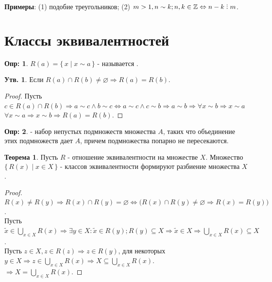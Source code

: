 \documentclass[12pt]{article}
\theoremstyle{definition}
\newtheorem{defn}{Опр:}
\newtheorem{prop}{Утв.}
\newtheorem{theorem}{Теорема}
\DeclareRobustCommand{\divby}{%
	\mathrel{\text{\vbox{\baselineskip.65ex\lineskiplimit0pt\hbox{.}\hbox{.}\hbox{.}}}}%
}
\begin{document}
\textbf{Примеры}: (1) подобие треугольников; (2) $m>1, n\sim k; n,k \in \mathbb{Z} \Leftrightarrow n - k \divby m$.
\newpage
\section*{Классы эквивалентностей}

\begin{defn}
	$R(a) = \{\,x \mid x \sim a\,\}$ - называется .
\end{defn}

\begin{prop}
	Если $R(a) \cap R(b) \neq \varnothing \Rightarrow R(a) = R(b)$.
\end{prop}

\begin{proof}
	Пусть $c \in R(a) \cap R(b) \Rightarrow a \sim c \wedge b \sim c \Leftrightarrow a \sim c \wedge c \sim b \Rightarrow a \sim b \Rightarrow \forall x \sim b \Rightarrow x \sim a$\\
	$\forall x \sim a \Rightarrow x \sim b \Rightarrow R(a) = R(b)$.
\end{proof}

\begin{defn}
	 - набор непустых подмножеств множества $A$, таких что объединение этих подмножеств дает $A$, причем подмножества попарно не пересекаются. 
\end{defn}

\begin{theorem}
	Пусть $R$ - отношение эквивалентности на множестве $X$. Множество $\{\,R(x) \mid x \in X\,\}$ - классов эквивалентности формируют разбиение множества $X$.
\end{theorem}

\begin{proof}
	$R(x) \neq R(y) \Rightarrow R(x) \cap R(y) = \varnothing \Leftrightarrow \big(R(x) \cap R(y) \neq \varnothing \Rightarrow R(x) = R(y)\big)$.\\
	Пусть $\tilde{x} \in \bigcup\limits_{x \in X} R(x) \Rightarrow \exists y \in X \colon \tilde{x} \in R(y); R(y) \subseteq X \Rightarrow \tilde{x} \in X \Rightarrow \bigcup\limits_{x \in X} R(x) \subseteq X$.\\
	Пусть $z \in X, z \in R(z) \Rightarrow z \in R(y)$, для некоторых $y \in X \Rightarrow z \in \bigcup\limits_{x \in X} R(x) \Rightarrow X \subseteq \bigcup\limits_{x \in X} R(x)$. \\
	$\Rightarrow X = \bigcup\limits_{x \in X} R(x)$. 
\end{proof}
\end{document}

